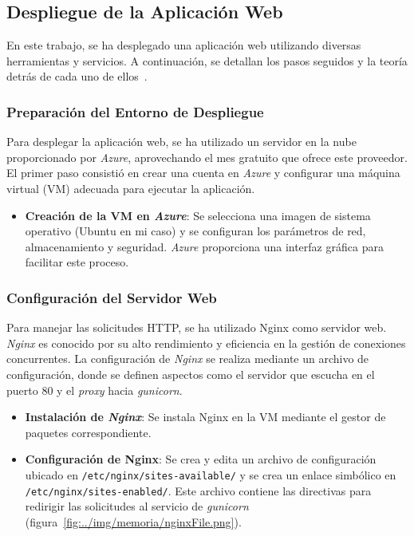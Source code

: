 \subsection{Despliegue de la Aplicación Web}
En este trabajo, se ha desplegado una aplicación web utilizando diversas herramientas y servicios. A continuación, se detallan los pasos seguidos y la teoría detrás de cada uno de ellos~\cite{deployApp}.

\subsubsection{Preparación del Entorno de Despliegue}

Para desplegar la aplicación web, se ha utilizado un servidor en la nube proporcionado por \textit{Azure}, aprovechando el mes gratuito que ofrece este proveedor. El primer paso consistió en crear una cuenta en \textit{Azure} y configurar una máquina virtual (VM) adecuada para ejecutar la aplicación.

\begin{itemize}
	\item \textbf{Creación de la VM en \textit{Azure}}: Se selecciona una imagen de sistema operativo (Ubuntu en mi caso) y se configuran los parámetros de red, almacenamiento y seguridad. \textit{Azure} proporciona una interfaz gráfica para facilitar este proceso.
\end{itemize}

\subsubsection{Configuración del Servidor Web}

Para manejar las solicitudes HTTP, se ha utilizado Nginx como servidor web. \textit{Nginx} es conocido por su alto rendimiento y eficiencia en la gestión de conexiones concurrentes. La configuración de \textit{Nginx} se realiza mediante un archivo de configuración, donde se definen aspectos como el servidor que escucha en el puerto 80 y el \textit{proxy} hacia \textit{gunicorn}.

\begin{itemize}
	\item \textbf{Instalación de \textit{Nginx}}: Se instala Nginx en la VM mediante el gestor de paquetes correspondiente.
	\item \textbf{Configuración de Nginx}: Se crea y edita un archivo de configuración ubicado en \texttt{/etc/nginx/sites-available/} y se crea un enlace simbólico en \texttt{/etc/nginx/sites-enabled/}. Este archivo contiene las directivas para redirigir las solicitudes al servicio de \textit{gunicorn} (figura~\ref{fig:../img/memoria/nginxFile.png}).
\end{itemize}

